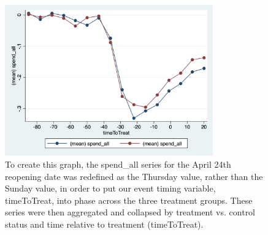 \documentclass[12pt,letterpaper]{article}
\begin{document}
        \begin{figure}[!ht]
          \centering
          \includegraphics[width=0.8\textwidth]{figures/spend_all_graph.png}
\caption{To create this graph, the spend\_all series for the April 24th reopening date was redefined as the Thursday value, rather than the Sunday value, in order to put our event timing variable, timeToTreat, into phase across the three treatment groups.  These series were then aggregated and collapsed by treatment vs. control status and time relative to treatment (timeToTreat).}
          \label{fig:figures-spend_all_graph-png}
        \end{figure}
        \clearpage
\end{document}
